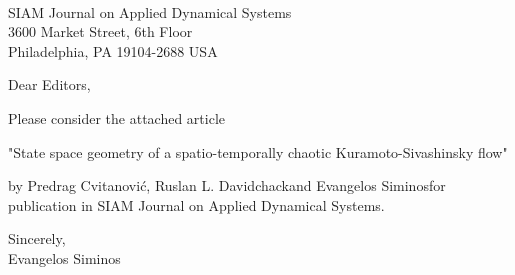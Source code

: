 \documentclass[12pt]{letter}
\begin{document}
\begin{letter}{
\\
SIAM Journal on Applied Dynamical Systems\\
3600 Market Street, 6th Floor\\
Philadelphia, PA 19104-2688 USA\\

}


\opening{Dear Editors,}

Please consider the attached article

"State space geometry of a spatio-temporally chaotic Kuramoto-Sivashinsky flow"

by Predrag Cvitanovi\'c\footnotemark[1], Ruslan L. Davidchack\footnotemark[2] 
and Evangelos Siminos\footnotemark[1] for publication in SIAM Journal on 
Applied Dynamical Systems. 

\renewcommand{\thefootnote}{\fnsymbol{footnote}}
\renewcommand{\thefootnote}{\arabic{footnote}}

\closing{Sincerely,\\ Evangelos Siminos}


\end{letter}
\end{document}
